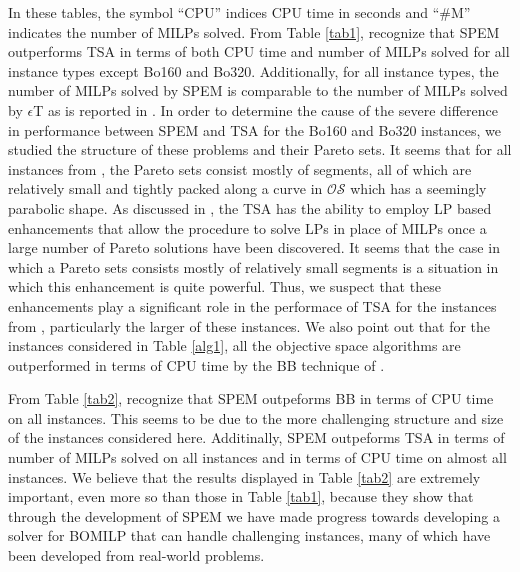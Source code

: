 \documentclass[12pt]{article}
\newcommand{\OS}{\mathcal{OS}}
\begin{document}
In these tables, the symbol ``CPU'' indices CPU time in seconds and ``\#M'' indicates the number of MILPs solved. From Table \ref{tab1}, recognize that SPEM outperforms TSA in terms of both CPU time and number of MILPs solved for all instance types except Bo160 and Bo320. Additionally, for all instance types, the number of MILPs solved by SPEM is comparable to the number of MILPs solved by $\epsilon$T as is reported in \citep{soylu2016exact}. In order to determine the cause of the severe difference in performance between SPEM and TSA for the Bo160 and Bo320 instances, we studied the structure of these problems and their Pareto sets. It seems that for all instances from \citep{boland2015criterion}, the Pareto sets consist mostly of segments, all of which are relatively small and tightly packed along a curve in $\OS$ which has a seemingly parabolic shape. As discussed in \citep{boland2015criterion}, the TSA has the ability to employ LP based enhancements that allow the procedure to solve LPs in place of MILPs once a large number of Pareto solutions have been discovered. It seems that the case in which a Pareto sets consists mostly of relatively small segments is a situation in which this enhancement is quite powerful. Thus, we suspect that these enhancements play a significant role in the performace of TSA for the instances from \citep{boland2015criterion}, particularly the larger of these instances. We also point out that for the instances considered in Table \ref{alg1}, all the objective space algorithms are outperformed in terms of CPU time by the BB technique of \citep{adelgren2016}.

From Table \ref{tab2}, recognize that SPEM outpeforms BB in terms of CPU time on all instances. This seems to be due to the more challenging structure and size of the instances considered here. Additinally, SPEM outpeforms TSA in terms of number of MILPs solved on all instances and in terms of CPU time on almost all instances. We believe that the results displayed in Table \ref{tab2} are extremely important, even more so than those in Table \ref{tab1}, because they show that through the development of SPEM we have made progress towards developing a solver for BOMILP that can handle challenging instances, many of which have been developed from real-world problems.
\end{document}
